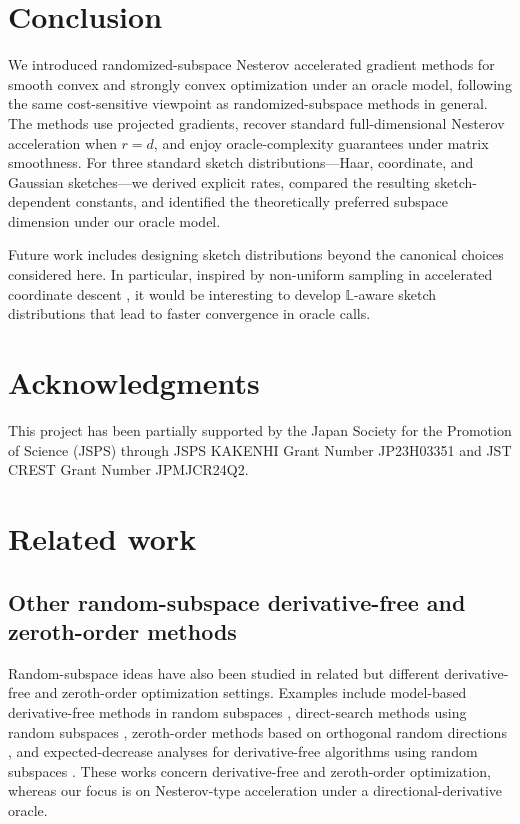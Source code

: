 \documentclass[10pt]{article}
\newcommand{\Lmat}{\mathbb{L}}
\begin{document}
\section{Conclusion}

We introduced randomized-subspace Nesterov accelerated gradient methods for
smooth convex and strongly convex optimization under an oracle
model, following the same cost-sensitive viewpoint as 
randomized-subspace methods in general. 
The methods use projected gradients,
recover standard
full-dimensional Nesterov acceleration when \(r=d\), and enjoy oracle-complexity guarantees
under matrix smoothness. For three standard sketch distributions---Haar,
coordinate, and Gaussian sketches---we derived explicit rates, compared the
resulting sketch-dependent constants, and identified the theoretically preferred
subspace dimension under our oracle model.

Future work includes designing sketch distributions beyond the canonical choices considered here. In particular, inspired by non-uniform sampling in accelerated coordinate descent \citep{allenzhu2016}, it would be interesting to develop \(\Lmat\)-aware sketch distributions that lead to faster convergence in oracle calls.

\section*{Acknowledgments}

This project has been partially supported by the Japan Society for the Promotion of Science (JSPS) through JSPS KAKENHI Grant Number JP23H03351 and JST CREST Grant Number JPMJCR24Q2.




\appendix


\section{Related work}
\label{app:related_work}
\subsection{Other random-subspace derivative-free and zeroth-order methods}

Random-subspace ideas have also been studied in related but different
derivative-free and zeroth-order optimization settings. Examples include
model-based derivative-free methods in random subspaces
\cite{cartis2023scalable}, direct-search methods using random subspaces
\cite{roberts2023direct}, zeroth-order methods based on orthogonal random
directions \cite{kozak2023zeroth}, and expected-decrease analyses for
derivative-free algorithms using random subspaces
\cite{hare2025expected}. These works concern derivative-free and zeroth-order
optimization, whereas our focus is on Nesterov-type acceleration under a
directional-derivative oracle.
\end{document}
